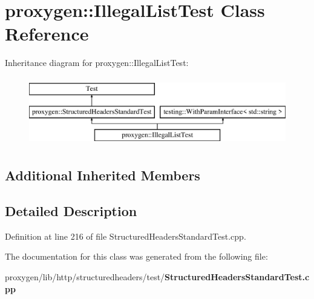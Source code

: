 \section{proxygen\+:\+:Illegal\+List\+Test Class Reference}
\label{classproxygen_1_1IllegalListTest}
Inheritance diagram for proxygen\+:\+:Illegal\+List\+Test\+:\begin{figure}[H]
\begin{center}
\leavevmode
\includegraphics[height=3.000000cm]{classproxygen_1_1IllegalListTest}
\end{center}
\end{figure}
\subsection*{Additional Inherited Members}


\subsection{Detailed Description}


Definition at line 216 of file Structured\+Headers\+Standard\+Test.\+cpp.



The documentation for this class was generated from the following file\+:\begin{DoxyCompactItemize}
\item 
proxygen/lib/http/structuredheaders/test/{\bf Structured\+Headers\+Standard\+Test.\+cpp}\end{DoxyCompactItemize}
